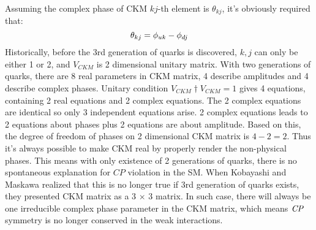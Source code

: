 Assuming the complex phase of CKM $kj$-th element is $\theta_{kj}$, it's obviously required that:
\begin{equation}
\large
\theta_{kj} = \phi_{uk}-\phi_{dj}
\end{equation}
 Historically, before the 3rd generation of quarks is discovered, $k,j$ can only be either 1 or 2, and $V_{CKM}$ is 2 dimensional unitary matrix. With two generations of quarks, there are 8 real parameters in CKM matrix, 4 describe amplitudes and 4 describe complex phases. Unitary condition $V_{CKM}{\dag} V_{CKM} = 1$ gives 4 equations, containing 2 real equations and 2 complex equations. The 2 complex equations are identical so only 3 independent equations arise.
2 complex equations leads to 2 equations about phases plus 2 equations are about amplitude. Based on this, the degree of freedom of phases on 2 dimensional CKM matrix is $4-2=2$. Thus it's always possible to make CKM real by properly render the non-physical phases.
This means with only existence of 2 generations of quarks, there is no spontaneous explanation for $CP$ violation in the SM. When Kobayashi and Maskawa realized that this is no longer true if 3rd generation of quarks exists, they presented CKM matrix as a 3 $\times$ 3 matrix. In such case, there will always be one irreducible complex phase parameter in the CKM matrix, which means $\it{CP}$ symmetry is no longer conserved in the weak interactions. 
\begin{comment}
Assuming the free phases are $\theta_{11}$ and $\theta_{22}$.Eq(2.15) presents: 
\begin{equation}
\large
\begin{pmatrix}
\theta_{11}\\
\theta_{22}
\end{pmatrix}
=
\begin{pmatrix}
1&-1&0&0\\
0&0&1&-1
\end{pmatrix}
\begin{pmatrix}
\phi_{u1} \\
\phi_{d1} \\
\phi_{u2} \\
\phi_{d2}
\end{pmatrix}
\end{equation}.
which is always render-able by properly choosing non-physical phases. 
\end{comment}




